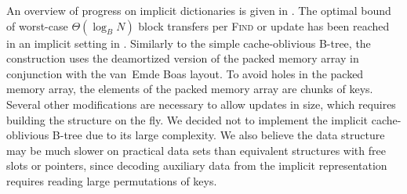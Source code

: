 An overview of progress on implicit dictionaries is given in
\cite{implicit-btrees-survey}. The optimal bound of worst-case
$\Theta(\log_B N)$ block transfers per \textsc{Find} or update has been reached
in an implicit setting in \cite{implicit-cob}. Similarly to the simple
cache-oblivious B-tree, the construction uses the deamortized version of
the packed memory array in conjunction with the van~Emde Boas layout. To avoid
holes in the packed memory array, the elements of the packed memory array are
chunks of keys.  Several other modifications are necessary to allow updates
in size, which requires building the structure on the fly.
We decided not to implement the implicit cache-oblivious B-tree due
to its large complexity. We also believe the data structure may be much
slower on practical data sets than equivalent structures with free slots or
pointers, since decoding auxiliary data from the implicit representation
requires reading large permutations of keys.
